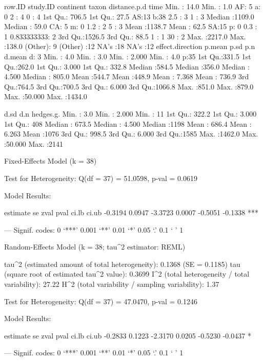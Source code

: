 \documentclass[11pt, a4paper]{article}
\begin{document}
\begin{Schunk}
\begin{Soutput}
     row.ID          study.ID     continent taxon   distance.p.d          time   
 Min.   :  14.0   Min.   :  1.0   AF: 5     a: 0   2      : 4    0          : 4  
 1st Qu.: 706.5   1st Qu.: 27.5   AS:13     b:38   2.5    : 3    1          : 3  
 Median :1109.0   Median : 59.0   CA: 5     m: 0   1.2    : 2    5          : 3  
 Mean   :1138.7   Mean   : 62.5   SA:15     p: 0   0.3    : 1    0.833333333: 2  
 3rd Qu.:1526.5   3rd Qu.: 88.5                    1      : 1    30         : 2  
 Max.   :2217.0   Max.   :138.0                    (Other): 9    (Other)    :12  
                                                   NA's   :18    NA's       :12  
 effect.direction     p.mean           p.sd            p.n             d.mean      
 d: 3             Min.   :  4.0   Min.   :  3.0   Min.   : 2.000   Min.   :   4.0  
 p:35             1st Qu.:331.5   1st Qu.:262.0   1st Qu.: 3.000   1st Qu.: 332.8  
                  Median :584.5   Median :356.0   Median : 4.500   Median : 805.0  
                  Mean   :544.7   Mean   :448.9   Mean   : 7.368   Mean   : 736.9  
                  3rd Qu.:764.5   3rd Qu.:700.5   3rd Qu.: 6.000   3rd Qu.:1066.8  
                  Max.   :851.0   Max.   :879.0   Max.   :50.000   Max.   :1434.0  
                                                                                   
      d.sd             d.n           hedges.g.   
 Min.   :   3.0   Min.   : 2.000   Min.   :  11  
 1st Qu.: 322.2   1st Qu.: 3.000   1st Qu.: 408  
 Median : 673.5   Median : 4.500   Median :1198  
 Mean   : 686.4   Mean   : 6.263   Mean   :1076  
 3rd Qu.: 998.5   3rd Qu.: 6.000   3rd Qu.:1585  
 Max.   :1462.0   Max.   :50.000   Max.   :2141  
\end{Soutput}
\begin{Soutput}
Fixed-Effects Model (k = 38)

Test for Heterogeneity: 
Q(df = 37) = 51.0598, p-val = 0.0619

Model Results:

estimate       se     zval     pval    ci.lb    ci.ub          
 -0.3194   0.0947  -3.3723   0.0007  -0.5051  -0.1338      *** 

---
Signif. codes:  0 ‘***’ 0.001 ‘**’ 0.01 ‘*’ 0.05 ‘.’ 0.1 ‘ ’ 1 
\end{Soutput}
\begin{Soutput}
Random-Effects Model (k = 38; tau^2 estimator: REML)

tau^2 (estimated amount of total heterogeneity): 0.1368 (SE = 0.1185)
tau (square root of estimated tau^2 value):      0.3699
I^2 (total heterogeneity / total variability):   27.22%
H^2 (total variability / sampling variability):  1.37

Test for Heterogeneity: 
Q(df = 37) = 47.0470, p-val = 0.1246

Model Results:

estimate       se     zval     pval    ci.lb    ci.ub          
 -0.2833   0.1223  -2.3170   0.0205  -0.5230  -0.0437        * 

---
Signif. codes:  0 ‘***’ 0.001 ‘**’ 0.01 ‘*’ 0.05 ‘.’ 0.1 ‘ ’ 1 
\end{Soutput}
\end{Schunk}
\end{document}
